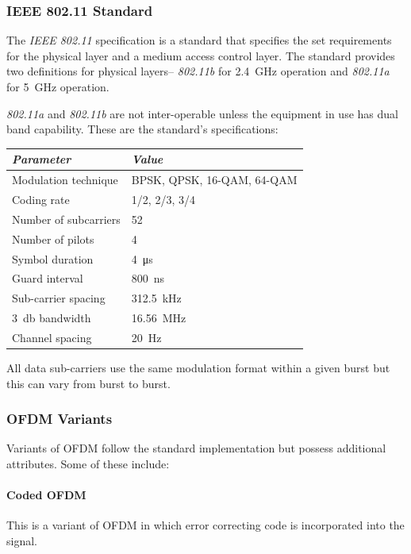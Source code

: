 \subsubsection{IEEE 802.11 Standard}
The \emph{IEEE 802.11} specification is a standard that specifies the set requirements for the physical layer and a medium access control layer. The standard provides two definitions for physical layers-- \emph{802.11b} for \SI{2.4}{\giga\hertz} operation and \emph{802.11a} for \SI{5}{\giga\hertz} operation\cite{802.11}.

\emph{802.11a} and \emph{802.11b} are not inter-operable unless the equipment in use has dual band capability. These are the standard's specifications:
\begin{table}
	\centering
	\renewcommand{\arraystretch}{1.5}
	\begin{tabular}{l l}
		\emph{Parameter} & \emph{Value}\\
		\hline
		Modulation technique & BPSK, QPSK, 16-QAM, 64-QAM \\
		Coding rate & 1/2, 2/3, 3/4 \\
		Number of subcarriers & 52 \\
		Number of pilots & 4 \\
		Symbol duration & \SI{4}{\micro\second} \\
		Guard interval & \SI{800}{\nano\second} \\
		Sub-carrier spacing & \SI{312.5}{\kilo\hertz} \\
		\SI{3}{\decibel} bandwidth & \SI{16.56}{\mega\hertz} \\
		Channel spacing & \SI{20}{\hertz}
	\end{tabular}
	\label{tab:litRev:802.11}
\end{table}
All data sub-carriers use the same modulation format within a given burst but this can vary from burst to burst.

\subsubsection{OFDM Variants}
Variants of OFDM follow the standard implementation but possess additional attributes. Some of these include:
\paragraph{Coded OFDM} This is a variant of OFDM in which error correcting code is incorporated into the signal.
